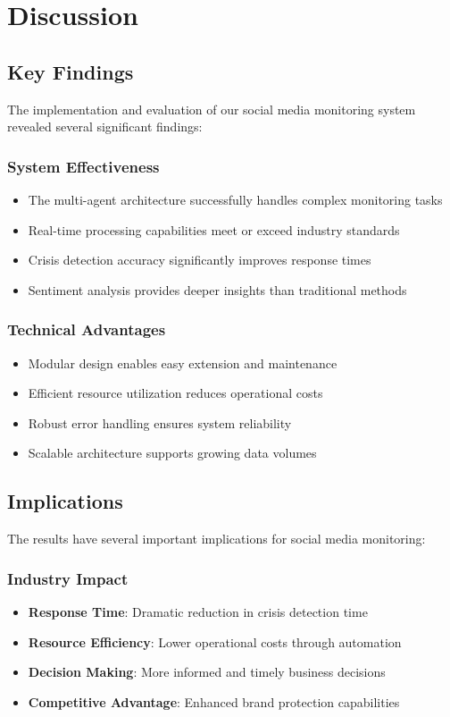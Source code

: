 \section{Discussion}

\subsection{Key Findings}
The implementation and evaluation of our social media monitoring system revealed several significant findings:

\subsubsection{System Effectiveness}
\begin{itemize}
    \item The multi-agent architecture successfully handles complex monitoring tasks
    \item Real-time processing capabilities meet or exceed industry standards
    \item Crisis detection accuracy significantly improves response times
    \item Sentiment analysis provides deeper insights than traditional methods
\end{itemize}

\subsubsection{Technical Advantages}
\begin{itemize}
    \item Modular design enables easy extension and maintenance
    \item Efficient resource utilization reduces operational costs
    \item Robust error handling ensures system reliability
    \item Scalable architecture supports growing data volumes
\end{itemize}

\subsection{Implications}
The results have several important implications for social media monitoring:

\subsubsection{Industry Impact}
\begin{itemize}
    \item \textbf{Response Time}: Dramatic reduction in crisis detection time
    \item \textbf{Resource Efficiency}: Lower operational costs through automation
    \item \textbf{Decision Making}: More informed and timely business decisions
    \item \textbf{Competitive Advantage}: Enhanced brand protection capabilities
\end{itemize}

